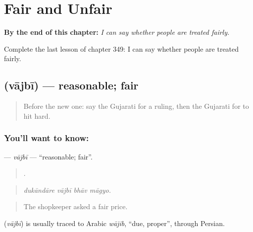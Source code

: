 
\chapter{Fair and Unfair}
\label{ch:gu-fair-and-unfair}

\begin{chapteropening}
\textbf{By the end of this chapter:} \emph{I can say whether people are treated fairly.}

Complete the last lesson of chapter 349: I can say whether people are treated fairly.
\end{chapteropening}

\section[\texorpdfstring{\gu{વાજબી} (vājbī)}{વાજબી (vājbī)}]{ (vājbī) — reasonable; fair}

\label{lesson:GU-C349-vajbi}



\begin{quote}
Before the new one: say the Gujarati for a ruling, then the Gujarati for to hit hard.
\end{quote}

\subsection*{You'll want to know: }
\textbf{} — \emph{vājbī} — \textquotedblleft{}reasonable; fair\textquotedblright{}.

\begin{quote}
   .
\end{quote}

\begin{quote}
\emph{dukāndāre vājbī bhāv māgyo.}
\end{quote}

\begin{quote}
The shopkeeper asked a fair price.
\end{quote}

\begin{cousinweb}
\textbf{} (\emph{vājbī}) is usually traced to Arabic \emph{wājib}, \textquotedblleft{}due, proper\textquotedblright{}, through Persian.
\end{cousinweb}

